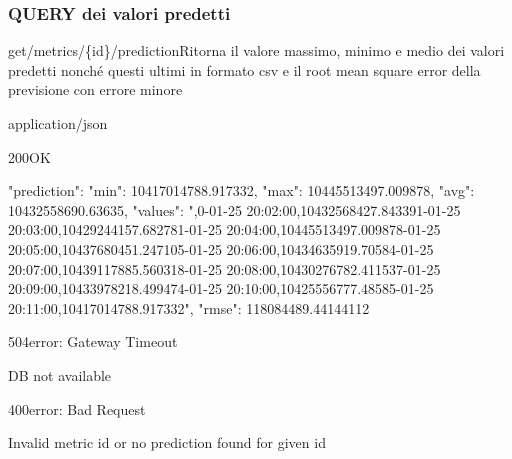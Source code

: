 \subsubsection{QUERY dei valori predetti}
    \begin{apiRoute}{get}{/metrics/\{id\}/prediction}{Ritorna il valore massimo, minimo e medio dei valori predetti nonché questi ultimi in formato csv e il root mean square error della previsione con errore minore}
    	
    	\begin{routeParameter}
    	\end{routeParameter}
    	\begin{routeResponse}{application/json}
    		\begin{routeResponseItem}{200}{OK}
    			\begin{routeResponseItemBody}
{
    "prediction": {
        "min": 10417014788.917332,
        "max": 10445513497.009878,
        "avg": 10432558690.63635,
        "values": ",0-01-25 20:02:00,10432568427.843391-01-25 20:03:00,10429244157.682781-01-25 20:04:00,10445513497.009878-01-25 20:05:00,10437680451.247105-01-25 20:06:00,10434635919.70584-01-25 20:07:00,10439117885.560318-01-25 20:08:00,10430276782.411537-01-25 20:09:00,10433978218.499474-01-25 20:10:00,10425556777.48585-01-25 20:11:00,10417014788.917332\n",
        "rmse": 118084489.44144112
    }
}
    			\end{routeResponseItemBody}
    		\end{routeResponseItem}
                \begin{routeResponseItem}{504}{error: Gateway Timeout}
    			\begin{routeResponseItemBody}
DB not available
    			\end{routeResponseItemBody}
    		\end{routeResponseItem}
    		\begin{routeResponseItem}{400}{error: Bad Request}
    			\begin{routeResponseItemBody}
Invalid metric id or no prediction found for given id
    			\end{routeResponseItemBody}
    		\end{routeResponseItem}
    	\end{routeResponse}
    	
    \end{apiRoute}